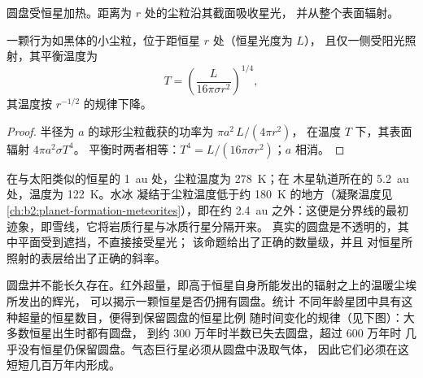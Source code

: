圆盘受恒星加热。距离为 $r$ 处的尘粒沿其截面吸收星光，
并从整个表面辐射。

\begin{proposition}[星光照射下尘粒的温度]
\label{prop:b2:ism-star-formation:grain}
一颗行为如黑体的小尘粒，位于距恒星 $r$ 处（恒星光度为 $L$），
且仅一侧受阳光照射，其平衡温度为
\[
  T = \left(\frac{L}{16\pi\sigma r^2}\right)^{1/4},
\]
其温度按 $r^{-1/2}$ 的规律下降。
\end{proposition}

\begin{proof}
半径为 $a$ 的球形尘粒截获的功率为 $\pi a^2\,L/(4\pi r^2)$，
在温度 $T$ 下，其表面辐射 $4\pi a^2\sigma T^4$。
平衡时两者相等：$T^4 = L/(16\pi\sigma r^2)$；$a$ 相消。
\end{proof}

在与太阳类似的恒星的 \qty{1}{au} 处，尘粒温度为 \qty{278}{K}；在
木星轨道所在的 \qty{5.2}{au} 处，温度为 \qty{122}{K}。水冰
凝结于尘粒温度低于约 \qty{180}{K} 的地方（凝聚温度见
\cref{ch:b2:planet-formation-meteorites}），即在约
\qty{2.4}{au} 之外：这便是分界线的最初迹象，即雪线，它将岩质行星与冰质行星分隔开来。
真实的圆盘是不透明的，其中平面受到遮挡，不直接接受星光；
该命题给出了正确的数量级，并且
对恒星所照射的表层给出了正确的斜率。

圆盘并不能长久存在。红外超量，即高于恒星自身所能发出的辐射之上的温暖尘埃所发出的辉光，
可以揭示一颗恒星是否仍拥有圆盘。统计
不同年龄星团中具有这种超量的恒星数目，便得到保留圆盘的恒星比例
随时间变化的规律（见下图）：大多数恒星出生时都有圆盘，
到约 300 万年时半数已失去圆盘，超过 600 万年时
几乎没有恒星仍保留圆盘。气态巨行星必须从圆盘中汲取气体，
因此它们必须在这短短几百万年内形成。

